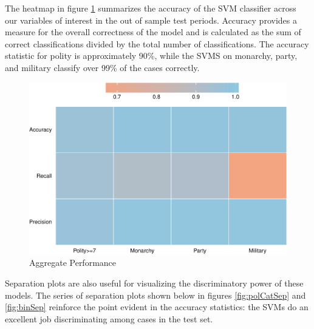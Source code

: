 \documentclass[pdftex,12pt,fullpage,oneside]{amsart}
\begin{document}
The heatmap in figure \ref{fig:aggPerf} summarizes the accuracy of the SVM classifier across our variables of interest in the out of sample test periods. Accuracy provides a measure for the overall correctness of the model and is calculated as the sum of correct classifications divided by the total number of classifications. The accuracy statistic for polity is approximately 90\%, while the SVMS on monarchy, party, and military classify over 99\% of the cases correctly. 


\begin{figure}[ht]
	\centering
	\includegraphics[width=.7\textwidth]{allAggPerf}	
	\caption{Aggregate Performance}
	\label{fig:aggPerf}
\end{figure}
\FloatBarrier

Separation plots are also useful for visualizing the discriminatory power of these models. The series of separation plots shown below in figures \ref{fig:polCatSep} and \ref{fig:binSep} reinforce the point evident in the accuracy statistics: the SVMs do an excellent job discriminating among cases in the test set.
\end{document}
